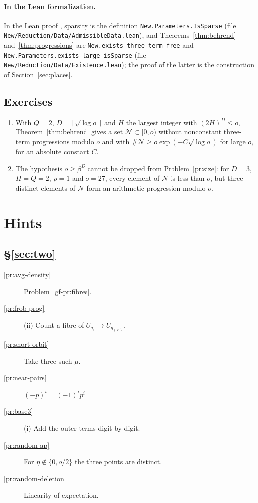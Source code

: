 \documentclass[reqno]{amsart}
\theoremstyle{definition}
\theoremstyle{plain}
\newcommand{\Nc}{\mathcal{N}}
\begin{document}
\paragraph{In the Lean formalization.}
In the Lean proof \cite{GL}, sparsity is the definition \texttt{New.Parameters.IsSparse} (file \texttt{New/Reduction/Data/AdmissibleData.lean}), and Theorems~\ref{thm:behrend} and~\ref{thm:progressions} are \texttt{New.exists\_three\_term\_free} and \texttt{New.Parameters.exists\_large\_isSparse} (file \texttt{New/Reduction/Data/Existence.lean}); the proof of the latter is the construction of Section~\ref{sec:places}.

\subsection*{Exercises}

\begin{enumerate}
\item With \(Q = 2\), \(D = \lceil\sqrt{\log o}\,\rceil\) and \(H\) the largest integer with \((2H)^D \le o\), Theorem~\ref{thm:behrend} gives a set \(\Nc \subset [0, o)\) without nonconstant three-term progressions modulo \(o\) and with \(\#\Nc \ge o\exp(-C\sqrt{\log o})\) for large \(o\), for an absolute constant \(C\).
\item The hypothesis \(o \ge \beta^D\) cannot be dropped from Problem~\ref{pr:size}: for \(D = 3\), \(H = Q = 2\), \(\rho = 1\) and \(o = 27\), every element of \(\Nc\) is less than \(o\), but three distinct elements of \(\Nc\) form an arithmetic progression modulo \(o\).
\end{enumerate}

\section*{Hints}

\subsection*{\S\ref{sec:two}}
\begin{description}
\item[\ref{pr:avg-density}] Problem~\ref{gf-pr:fibres}.
\item[\ref{pr:frob-prog}] (ii) Count a fibre of \(U_{q_1} \to U_{q_{(\ell)}}\).
\item[\ref{pr:short-orbit}] Take three such \(\mu\).
\item[\ref{pr:near-pairs}] \((-p)^i = (-1)^ip^i\).
\item[\ref{pr:base3}] (i) Add the outer terms digit by digit.
\item[\ref{pr:random-ap}] For \(\eta \notin \{0, o/2\}\) the three points are distinct.
\item[\ref{pr:random-deletion}] Linearity of expectation.
\end{description}
\end{document}
